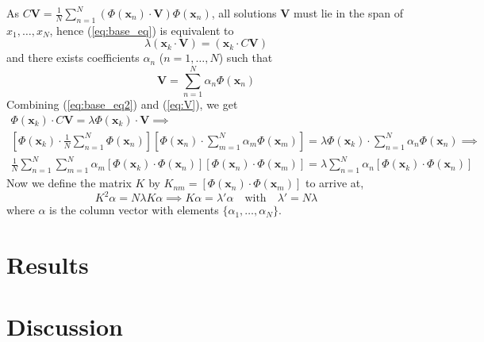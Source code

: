 \documentclass[12pt]{article}
\newcommand{\V}{\mathbf{V}}
\newcommand{\x}{\mathbf{x}}
\begin{document}
As $C\V = \frac{1}{N}\sum_{n=1}^{N}(\Phi(\x_n)\cdot\V)\Phi(\x_n)$, all
solutions $\V$ must lie in the span of $x_1,\dots,x_N$, hence
(\ref{eq:base_eq}) is equivalent to
\begin{equation}
    \lambda(\x_k \cdot \V) = (\x_k \cdot C\V) \label{eq:base_eq2}
\end{equation}
and there exists coefficients $\alpha_n$ ($n=1,\dots, N$) such that
\begin{equation}
    \V = \sum_{n=1}^{N}\alpha_n\Phi(\x_n) \label{eq:V}
\end{equation}
Combining (\ref{eq:base_eq2}) and (\ref{eq:V}), we get
\begin{gather*}
    \Phi(\x_k) \cdot C \V = \lambda \Phi(\x_k) \cdot \V \implies\\ 
    [\Phi(\x_k) \cdot \frac{1}{N}\sum_{n=1}^{N}\Phi(\x_n)][\Phi(\x_n) \cdot \sum_{m=1}^{N}\alpha_m\Phi(\x_m)] = \lambda \Phi(\x_k) \cdot \sum_{n=1}^{N}\alpha_n \Phi(\x_n) \implies\\
     \frac{1}{N}\sum_{n=1}^{N}\sum_{m=1}^{N}\alpha_m[\Phi(\x_k) \cdot \Phi(\x_n)][\Phi(\x_n) \cdot \Phi(\x_m)] = \lambda \sum_{n=1}^{N}\alpha_n [\Phi(\x_k) \cdot \Phi(\x_n)]
\end{gather*}
Now we define the matrix $K$ by $K_{nm} = [\Phi(\x_n) \cdot \Phi(\x_m)]$ to arrive at,
\begin{equation}
    K^2 \alpha=N \lambda K \alpha \implies K \alpha = \lambda'\alpha \quad\text{with}\quad \lambda' = N \lambda
\end{equation}
where $\alpha$ is the column vector with elements $\{\alpha_1, \dots, \alpha_N\}$.


\section{Results}

\section{Discussion}
\end{document}
